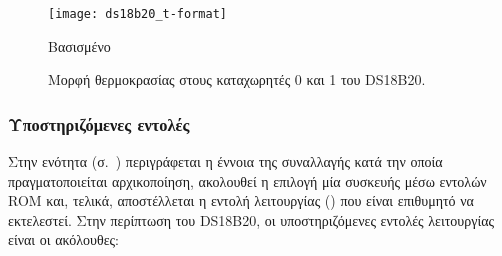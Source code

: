 \begin{figure}
    \caption{Μορφή θερμοκρασίας στους καταχωρητές 0 και 1 του DS18B20.
    \label{fig:ds18b20:t-format}}
    \begin{center}
    \texttt{[image: ds18b20\_t-format]}
    \end{center}
    Βασισμένο 
\end{figure}

\subsubsection{Υποστηριζόμενες εντολές}
\label{ssubsec:ds18b20:commands}

Στην ενότητα  (σ.~\pageref{subsec:1-wire}) περιγράφεται η
έννοια της συναλλαγής κατά την οποία πραγματοποιείται αρχικοποίηση, ακολουθεί η
επιλογή μία συσκευής  μέσω εντολών ROM και, τελικά, αποστέλλεται η
εντολή λειτουργίας () που είναι επιθυμητό να εκτελεστεί.
Στην περίπτωση του DS18B20, οι υποστηριζόμενες εντολές λειτουργίας είναι οι
ακόλουθες:
